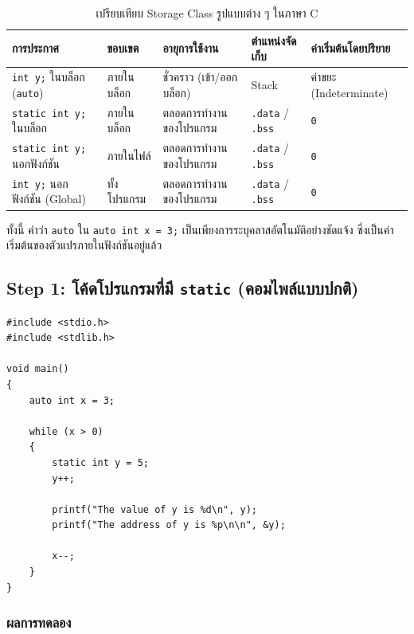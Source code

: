 \documentclass[a4paper,11pt]{article}
\newcommand{\code}[1]{\texttt{#1}}
\begin{document}
\begin{table}[H]
\centering\small
\caption{เปรียบเทียบ Storage Class รูปแบบต่าง ๆ ในภาษา C}
\begin{tabular}{p{3.2cm}p{2.2cm}p{2.8cm}p{2.2cm}p{2.8cm}}
\toprule
\textbf{การประกาศ} & \textbf{ขอบเขต} & \textbf{อายุการใช้งาน} & \textbf{ตำแหน่งจัดเก็บ} & \textbf{ค่าเริ่มต้นโดยปริยาย} \\
\midrule
\code{int y;} ในบล็อก (\code{auto}) & ภายในบล็อก & ชั่วคราว (เข้า/ออกบล็อก) & Stack & ค่าขยะ (Indeterminate) \\
\code{static int y;} ในบล็อก & ภายในบล็อก & ตลอดการทำงานของโปรแกรม & \code{.data} / \code{.bss} & \code{0} \\
\code{static int y;} นอกฟังก์ชัน & ภายในไฟล์ & ตลอดการทำงานของโปรแกรม & \code{.data} / \code{.bss} & \code{0} \\
\code{int y;} นอกฟังก์ชัน (Global) & ทั้งโปรแกรม & ตลอดการทำงานของโปรแกรม & \code{.data} / \code{.bss} & \code{0} \\
\bottomrule
\end{tabular}
\end{table}

ทั้งนี้ คำว่า \code{auto} ใน \code{auto int x = 3;} เป็นเพียงการระบุคลาสอัตโนมัติอย่างชัดแจ้ง ซึ่งเป็นค่าเริ่มต้นของตัวแปรภายในฟังก์ชันอยู่แล้ว

\subsection{Step 1: โค้ดโปรแกรมที่มี \code{static} (คอมไพล์แบบปกติ)}

\begin{lstlisting}[style=cstyle,caption={\code{src/q1\_static.c} โค้ดเริ่มต้นตามใบงาน}]
#include <stdio.h>
#include <stdlib.h>

void main()
{
    auto int x = 3;

    while (x > 0)
    {
        static int y = 5;
        y++;

        printf("The value of y is %d\n", y);
        printf("The address of y is %p\n\n", &y);

        x--;
    }
}
\end{lstlisting}

\subsubsection{ผลการทดลอง}
\end{document}
